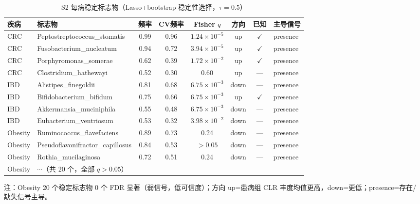 \begin{table}[htbp]
\centering
\caption{S2 每病稳定标志物（Lasso+bootstrap 稳定性选择，$\tau=0.5$）}
\label{tab:s2-stable-biomarkers}
\small
\begin{tabular}{llcccccl}
\toprule
疾病 & 标志物 & 频率 & CV频率 & Fisher $q$ & 方向 & 已知 & 主导信号 \\
\midrule
CRC & Peptostreptococcus\_stomatis & 0.99 & 0.96 & $1.24\times10^{-5}$ & up & $\checkmark$ & presence \\
CRC & Fusobacterium\_nucleatum & 0.94 & 0.72 & $3.94\times10^{-5}$ & up & $\checkmark$ & presence \\
CRC & Porphyromonas\_somerae & 0.62 & 0.39 & $1.72\times10^{-2}$ & up & $\checkmark$ & presence \\
CRC & Clostridium\_hathewayi & 0.52 & 0.30 & 0.60 & up & --- & presence \\
\midrule
IBD & Alistipes\_finegoldii & 0.81 & 0.68 & $6.75\times10^{-3}$ & down & --- & presence \\
IBD & Bifidobacterium\_bifidum & 0.75 & 0.66 & $6.75\times10^{-3}$ & up & $\checkmark$ & presence \\
IBD & Akkermansia\_muciniphila & 0.55 & 0.48 & $6.75\times10^{-3}$ & down & --- & presence \\
IBD & Eubacterium\_ventriosum & 0.53 & 0.32 & $3.98\times10^{-2}$ & down & --- & presence \\
\midrule
Obesity & Ruminococcus\_flavefaciens & 0.89 & 0.73 & 0.24 & down & --- & presence \\
Obesity & Pseudoflavonifractor\_capillosus & 0.84 & 0.53 & $>0.05$ & down & --- & presence \\
Obesity & Rothia\_mucilaginosa & 0.72 & 0.51 & 0.24 & down & --- & presence \\
Obesity & $\cdots$（共 20 个，全部 $q>0.05$） & & & & & & \\
\bottomrule
\end{tabular}
\par\footnotesize
注：Obesity 20 个稳定标志物 0 个 FDR 显著（弱信号，低可信度）；方向 up=患病组 CLR 丰度均值更高，down=更低；presence=存在/缺失信号主导。
\end{table}
